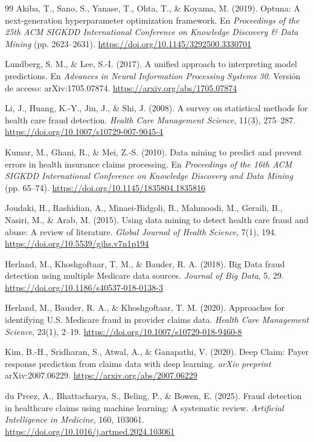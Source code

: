 \documentclass[12pt,letterpaper]{report}
\begin{document}
\begin{thebibliography}{99}
Akiba, T., Sano, S., Yanase, T., Ohta, T., \& Koyama, M. (2019). Optuna: A next-generation hyperparameter optimization framework. En \textit{Proceedings of the 25th ACM SIGKDD International Conference on Knowledge Discovery \& Data Mining} (pp. 2623--2631). \url{https://doi.org/10.1145/3292500.3330701}

Lundberg, S. M., \& Lee, S.-I. (2017). A unified approach to interpreting model predictions. En \textit{Advances in Neural Information Processing Systems 30}. Versión de acceso: arXiv:1705.07874. \url{https://arxiv.org/abs/1705.07874}

Li, J., Huang, K.-Y., Jin, J., \& Shi, J. (2008). A survey on statistical methods for health care fraud detection. \textit{Health Care Management Science}, 11(3), 275--287. \url{https://doi.org/10.1007/s10729-007-9045-4}

Kumar, M., Ghani, R., \& Mei, Z.-S. (2010). Data mining to predict and prevent errors in health insurance claims processing. En \textit{Proceedings of the 16th ACM SIGKDD International Conference on Knowledge Discovery and Data Mining} (pp. 65--74). \url{https://doi.org/10.1145/1835804.1835816}

Joudaki, H., Rashidian, A., Minaei-Bidgoli, B., Mahmoodi, M., Geraili, B., Nasiri, M., \& Arab, M. (2015). Using data mining to detect health care fraud and abuse: A review of literature. \textit{Global Journal of Health Science}, 7(1), 194. \url{https://doi.org/10.5539/gjhs.v7n1p194}

Herland, M., Khoshgoftaar, T. M., \& Bauder, R. A. (2018). Big Data fraud detection using multiple Medicare data sources. \textit{Journal of Big Data}, 5, 29. \url{https://doi.org/10.1186/s40537-018-0138-3}

Herland, M., Bauder, R. A., \& Khoshgoftaar, T. M. (2020). Approaches for identifying U.S. Medicare fraud in provider claims data. \textit{Health Care Management Science}, 23(1), 2--19. \url{https://doi.org/10.1007/s10729-018-9460-8}

Kim, B.-H., Sridharan, S., Atwal, A., \& Ganapathi, V. (2020). Deep Claim: Payer response prediction from claims data with deep learning. \textit{arXiv preprint} arXiv:2007.06229. \url{https://arxiv.org/abs/2007.06229}

du Preez, A., Bhattacharya, S., Beling, P., \& Bowen, E. (2025). Fraud detection in healthcare claims using machine learning: A systematic review. \textit{Artificial Intelligence in Medicine}, 160, 103061. \url{https://doi.org/10.1016/j.artmed.2024.103061}


\end{thebibliography}
\end{document}

